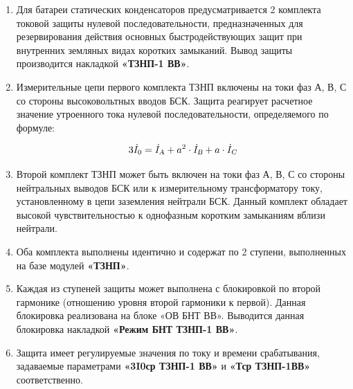 \color{black}

\begin{enumerate}[label=\arabic{section}.\arabic{subsection}.\arabic{enumi}, labelsep=4pt, leftmargin=0pt, itemindent=57pt, itemsep=0pt, parsep=0pt] %


\item
Для батареи статических конденсаторов предусматривается 2 комплекта токовой защиты нулевой 
последовательности, предназначенных для резервирования действия основных быстродействующих 
защит при внутренних земляных видах коротких замыканий. Вывод защиты производится накладкой 
\textbf{«ТЗНП-1 ВВ»}.

\item
Измерительные цепи первого комплекта ТЗНП включены на токи фаз А, В, С со стороны 
высоковольтных вводов БСК. Защита реагирует расчетное значение утроенного тока нулевой 
последовательности, определяемого по формуле:

\begin{equation}
\label{eq:3I0}
3\dot{I}_{0} = \dot{I}_{\textsl{A}} + a^2 \cdot \dot{I}_{\textsl{B}} + a \cdot \dot{I}_{\textsl{C}}
\end{equation}

\item
Второй комплект ТЗНП может быть включен на токи фаз А, В, С со стороны нейтральных выводов 
БСК или к измерительному трансформатору току, установленному в цепи заземления нейтрали БСК. 
Данный комплект обладает высокой чувствительностью к однофазным коротким замыканиям вблизи 
нейтрали. 

\item
Оба комплекта выполнены идентично и содержат по 2 ступени, выполненных на базе модулей 
\textbf{«ТЗНП»}.  

\item
Каждая из ступеней защиты может выполнена с блокировкой по второй гармонике (отношению 
уровня второй гармоники к первой). Данная блокировка реализована на блоке  «ОВ БНТ ВВ». Выводится 
данная блокировка накладкой \textbf{«Режим БНТ ТЗНП-1 ВВ»}. 

\item
Защита имеет регулируемые значения по току и времени срабатывания, задаваемые 
параметрами \textbf{«3I0ср ТЗНП-1 ВВ»} и \textbf{«Тср ТЗНП-1ВВ»} соответственно. 


\end{enumerate}
